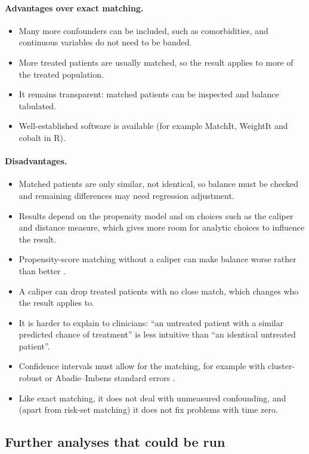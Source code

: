 \paragraph{Advantages over exact matching.}
\begin{itemize}
\item Many more confounders can be included, such as comorbidities, and continuous variables do not need to be banded.
\item More treated patients are usually matched, so the result applies to more of the treated population.
\item It remains transparent: matched patients can be inspected and balance tabulated.
\item Well-established software is available (for example MatchIt, WeightIt and cobalt in R).
\end{itemize}

\paragraph{Disadvantages.}
\begin{itemize}
\item Matched patients are only similar, not identical, so balance must be checked and remaining differences may need regression adjustment.
\item Results depend on the propensity model and on choices such as the caliper and distance measure, which gives more room for analytic choices to influence the result.
\item Propensity-score matching without a caliper can make balance worse rather than better \cite{king2019}.
\item A caliper can drop treated patients with no close match, which changes who the result applies to.
\item It is harder to explain to clinicians: ``an untreated patient with a similar predicted chance of treatment'' is less intuitive than ``an identical untreated patient''.
\item Confidence intervals must allow for the matching, for example with cluster-robust or Abadie--Imbens standard errors \cite{abadie2006}.
\item Like exact matching, it does not deal with unmeasured confounding, and (apart from risk-set matching) it does not fix problems with time zero.
\end{itemize}

\subsection{Further analyses that could be run}

